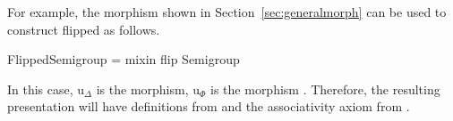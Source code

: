 For example, the morphism  shown in Section~\ref{sec:generalmorph} can be used to construct flipped  as follows. 
\begin{togcode} 
FlippedSemigroup = mixin flip {} Semigroup {} 
\end{togcode} 
In this case, $\text{u}_\Delta$ is the  morphism, $\text{u}_\Phi$ is the morphism . Therefore, the resulting presentation  will have definitions from  and the associativity axiom from . 


 
%
\begin{comment}
There are two different ways by which a user or a library builder can define a new theory; either by stating all its components or by reusing existing theories. While an end user might in some cases prefer the first approach for the formalization tasks, a library is more rich in information if it deploys the second approach. For example, defining a \group to be a \monoid with inverse gives us more information than what are its declarations, it also tell us about how it is related to \monoid. Most systems provide users with at least inclusions which enable them to include a verbatim version of one theory into the other, so the relation between \group and \monoid mentioned here can be captured. But, is this enough? 

\end{comment}